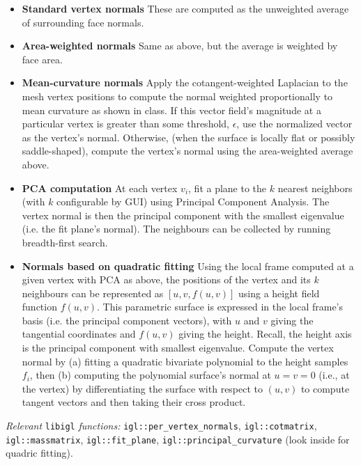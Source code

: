 \documentclass[11pt]{amsart}
\begin{document}
\begin{itemize}
\item \textbf{Standard vertex normals} These are computed as the unweighted average of surrounding face normals.
\item \textbf{Area-weighted  normals} Same as above, but the average is weighted by face area.
\item \textbf{Mean-curvature normals} Apply the cotangent-weighted Laplacian to
    the mesh vertex positions to compute the normal weighted proportionally to
        mean curvature as shown in class. If this vector field's magnitude at a
        particular vertex
        is greater than some threshold, $\epsilon$, use the normalized vector as
        the vertex's normal.
        Otherwise, (when the surface is locally flat or possibly saddle-shaped), compute
        the vertex's normal using the area-weighted average above.
\item \textbf{PCA computation} At each vertex $v_i$, fit a plane to the $k$
    nearest neighbors (with $k$ configurable by GUI) using Principal Component Analysis. The
    vertex normal is then the principal component with the smallest
    eigenvalue (i.e. the fit plane's normal). The neighbours can be collected by
    running breadth-first search.
\item \textbf{Normals based on quadratic fitting} Using the local frame computed
    at a given vertex with PCA as above, the positions of the vertex and its $k$
        neighbours can be represented as $[u, v, f(u, v)]$ using a height field
        function $f(u, v)$. This parametric surface is expressed in the local
        frame's basis (i.e. the principal component vectors), with $u$ and $v$
        giving the tangential coordinates and $f(u, v)$ giving the height.
        Recall, the height axis is the principal component with smallest
        eigenvalue. Compute the vertex normal by (a) fitting a quadratic
        bivariate polynomial to the height samples $f_i$, then (b)
        computing the polynomial surface's normal at $u = v = 0$ (i.e., at the
        vertex) by differentiating the surface with respect to $(u, v)$ to
        compute tangent vectors and then taking their cross product.
\end{itemize}

\emph{Relevant} \texttt{libigl} \emph{functions: }
\texttt{igl::per\_vertex\_normals}, \texttt{igl::cotmatrix},
\texttt{igl::massmatrix}, \texttt{igl::fit\_plane},
\texttt{igl::principal\_curvature} (look inside for quadric fitting).
\end{document}
